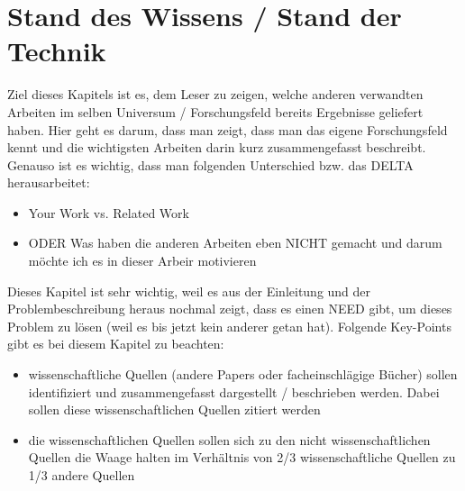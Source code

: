 

\chapter{Stand des Wissens / Stand der Technik}

Ziel dieses Kapitels ist es, dem Leser zu zeigen, welche anderen verwandten Arbeiten im selben Universum / Forschungsfeld bereits Ergebnisse geliefert haben. Hier geht es darum, dass man zeigt, dass man das eigene Forschungsfeld kennt und die wichtigsten Arbeiten darin kurz zusammengefasst beschreibt. Genauso ist es wichtig, dass man folgenden Unterschied bzw. das DELTA herausarbeitet:

\begin{itemize}
	\item Your Work vs. Related Work
	\item ODER Was haben die anderen Arbeiten eben NICHT gemacht und darum möchte ich es in dieser Arbeir motivieren
\end{itemize}

\noindent
Dieses Kapitel ist sehr wichtig, weil es aus der Einleitung und der Problembeschreibung heraus nochmal zeigt, dass es einen NEED gibt, um dieses Problem zu lösen (weil es bis jetzt kein anderer getan hat). Folgende Key-Points gibt es bei diesem Kapitel zu beachten:

\begin{itemize}
	\item wissenschaftliche Quellen (andere Papers oder facheinschlägige Bücher) sollen identifiziert und zusammengefasst dargestellt / beschrieben werden. Dabei sollen diese wissenschaftlichen Quellen zitiert werden
	\item die wissenschaftlichen Quellen sollen sich zu den nicht wissenschaftlichen Quellen die Waage halten im
	      Verhältnis von 2/3 wissenschaftliche Quellen zu 1/3 andere Quellen
\end{itemize}

